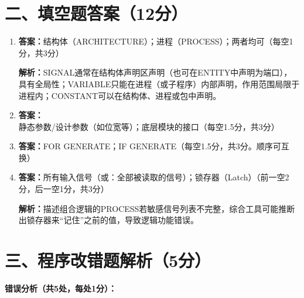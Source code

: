 \section{二、填空题答案（12分）}

\begin{enumerate}[label=\arabic*., leftmargin=*]

\item \textbf{答案：}结构体（ARCHITECTURE）；进程（PROCESS）；两者均可（每空1分，共3分）

\textbf{解析：}SIGNAL通常在结构体声明区声明（也可在ENTITY中声明为端口），具有全局性；VARIABLE只能在进程（或子程序）内部声明，作用范围局限于进程内；CONSTANT可以在结构体、进程或包中声明。

\item \textbf{答案：}静态参数/设计参数（如位宽等）；底层模块的接口（每空1.5分，共3分）

\item \textbf{答案：}FOR GENERATE；IF GENERATE（每空1.5分，共3分。顺序可互换）

\item \textbf{答案：}所有输入信号（或：全部被读取的信号）；锁存器（Latch）（前一空2分，后一空1分，共3分）

\textbf{解析：}描述组合逻辑的PROCESS若敏感信号列表不完整，综合工具可能推断出锁存器来“记住”之前的值，导致逻辑功能错误。

\end{enumerate}

\section{三、程序改错题解析（5分）}

\textbf{错误分析（共5处，每处1分）：}

